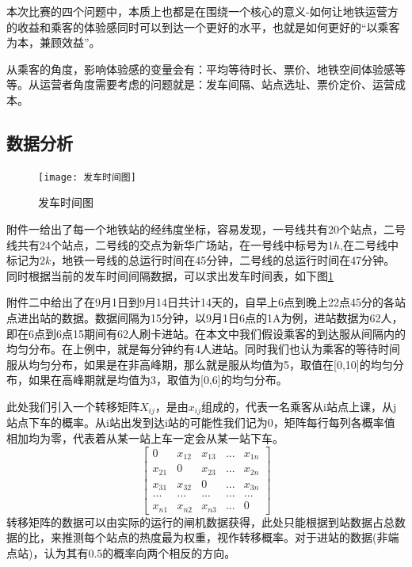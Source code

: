 \documentclass[12pt,a4paper]{mcmthesis}
\begin{document}
本次比赛的四个问题中，本质上也都是在围绕一个核心的意义-如何让地铁运营方的收益和乘客的体验感同时可以到达一个更好的水平，也就是如何更好的“以乘客为本，兼顾效益”。

从乘客的角度，影响体验感的变量会有：平均等待时长、票价、地铁空间体验感等等。从运营者角度需要考虑的问题就是：发车间隔、站点选址、票价定价、运营成本。


\subsection{数据分析}
\begin{figure}[h!t]
	\centerline{\texttt{[image: 发车时间图]}\quad
	}
	\caption{\song\wuhao
		发车时间图}
	\label{fig:发车时间图}
\end{figure}

附件一给出了每一个地铁站的经纬度坐标，容易发现，一号线共有20个站点，二号线共有24个站点，二号线的交点为新华广场站，在一号线中标号为$1h$,在二号线中标记为$2k$，地铁一号线的总运行时间在45分钟，二号线的总运行时间在47分钟。同时根据当前的发车时间间隔数据，可以求出发车时间表，如下图\ref{fig:发车时间图}

附件二中给出了在9月1日到9月14日共计14天的，自早上6点到晚上22点45分的各站点进出站的数据。数据间隔为15分钟，以9月1日6点的1A为例，进站数据为62人，即在6点到6点15期间有62人刷卡进站。在本文中我们假设乘客的到达服从间隔内的均匀分布。在上例中，就是每分钟约有4人进站。同时我们也认为乘客的等待时间服从均匀分布，如果是在非高峰期，那么就是服从均值为5，取值在[0,10]的均匀分布，如果在高峰期就是均值为3，取值为[0,6]的均匀分布。

此处我们引入一个转移矩阵$X_{ij}$，是由$x_{ij}$组成的，代表一名乘客从i站点上课，从j站点下车的概率。从i站出发到达i站的可能性我们记为0，矩阵每行每列各概率值相加均为零，代表着从某一站上车一定会从某一站下车。
\begin{equation}
\begin{bmatrix}
	0 &x_{12}  &x_{13} &... & x_{1n}\\
	x_{21} &0  &x_{23} & ... &x_{2n} \\
	x_{31} & x_{32} &0 & ...&x_{3n} \\
	...&  ... &   ...&  ... &...\\
	x_{n1} & x_{n2} &x_{n3} &... &0
\end{bmatrix}
\end{equation}
转移矩阵的数据可以由实际的运行的闸机数据获得，此处只能根据到站数据占总数据的比，来推测每个站点的热度最为权重，视作转移概率。对于进站的数据(非端点站)，认为其有0.5的概率向两个相反的方向。
\end{document}

